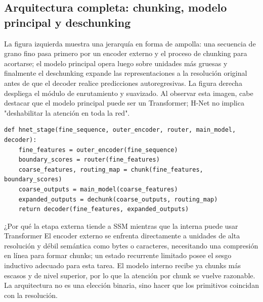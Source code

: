 
\subsection{Arquitectura completa: chunking, modelo principal y deschunking}

La figura izquierda muestra una jerarquía en forma de ampolla: una secuencia de grano fino pasa primero por un encoder externo y el proceso de chunking para acortarse; el modelo principal opera luego sobre unidades más gruesas y finalmente el deschunking expande las representaciones a la resolución original antes de que el decoder realice predicciones autoregresivas. La figura derecha despliega el módulo de enrutamiento y suavizado. Al observar esta imagen, cabe destacar que el modelo principal puede ser un Transformer; H-Net no implica "deshabilitar la atención en toda la red".


\begin{lstlisting}[caption={Flujo de datos didáctico para una sola jerarquía de H-Net}]
def hnet_stage(fine_sequence, outer_encoder, router, main_model, decoder):
    fine_features = outer_encoder(fine_sequence)
    boundary_scores = router(fine_features)
    coarse_features, routing_map = chunk(fine_features, boundary_scores)
    coarse_outputs = main_model(coarse_features)
    expanded_outputs = dechunk(coarse_outputs, routing_map)
    return decoder(fine_features, expanded_outputs)
\end{lstlisting}

\begin{knowledgebox}{¿Por qué la etapa externa tiende a SSM mientras que la interna puede usar Transformer}
El encoder externo se enfrenta directamente a unidades de alta resolución y débil semántica como bytes o caracteres, necesitando una compresión en línea para formar chunks; un estado recurrente limitado posee el sesgo inductivo adecuado para esta tarea. El modelo interno recibe ya chunks más escasos y de nivel superior, por lo que la atención por chunk se vuelve razonable. La arquitectura no es una elección binaria, sino hacer que los primitivos coincidan con la resolución.
\end{knowledgebox}

